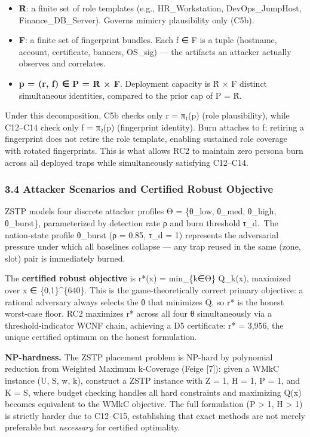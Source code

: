 \documentclass[
  11pt,
]{article}
\providecommand{\tightlist}{%
  \setlength{\itemsep}{0pt}\setlength{\parskip}{0pt}}
\begin{document}
\begin{itemize}
\tightlist
\item
  \textbf{R̂}: a finite set of role templates (e.g., HR\_Workstation,
  DevOps\_JumpHost, Finance\_DB\_Server). Governs mimicry plausibility
  only (C5b).
\item
  \textbf{F}: a finite set of fingerprint bundles. Each f ∈ F is a tuple
  (hostname, account, certificate, banners, OS\_sig) --- the artifacts
  an attacker actually observes and correlates.
\item
  \textbf{p = (r, f) ∈ P = R̂ × F}. Deployment capacity is
  \textbar R̂\textbar{} × \textbar F\textbar{} distinct simultaneous
  identities, compared to the prior cap of \textbar P\textbar{} =
  \textbar R̂\textbar.
\end{itemize}

Under this decomposition, C5b checks only r = π₁(p) (role plausibility),
while C12--C14 check only f = π₂(p) (fingerprint identity). Burn
attaches to f; retiring a fingerprint does not retire the role template,
enabling sustained role coverage with rotated fingerprints. This is what
allows RC2 to maintain zero persona burn across all deployed traps while
simultaneously satisfying C12--C14.

\hypertarget{attacker-scenarios-and-certified-robust-objective}{%
\subsubsection{3.4 Attacker Scenarios and Certified Robust
Objective}\label{attacker-scenarios-and-certified-robust-objective}}

ZSTP models four discrete attacker profiles Θ = \{θ\_low, θ\_med,
θ\_high, θ\_burst\}, parameterized by detection rate ρ and burn
threshold τ\_d.~The nation-state profile θ\_burst (ρ = 0.85, τ\_d = 1)
represents the adversarial pressure under which all baselines collapse
--- any trap reused in the same (zone, slot) pair is immediately burned.

The \textbf{certified robust objective} is r*(x) = min\_\{k∈Θ\} Q\_k(x),
maximized over x ∈ \{0,1\}\^{}\{640\}. This is the game-theoretically
correct primary objective: a rational adversary always selects the θ
that minimizes Q, so r* is the honest worst-case floor. RC2 maximizes r*
across all four θ simultaneously via a threshold-indicator WCNF chain,
achieving a D5 certificate: r* = 3,956, the unique certified optimum on
the honest formulation.

\textbf{NP-hardness.} The ZSTP placement problem is NP-hard by
polynomial reduction from Weighted Maximum k-Coverage (Feige {[}7{]}):
given a WMkC instance (U, S, w, k), construct a ZSTP instance with
\textbar Z\textbar{} = 1, H = 1, \textbar P\textbar{} = 1, and
\textbar K\textbar{} = \textbar S\textbar, where budget checking handles
all hard constraints and maximizing Q(x) becomes equivalent to the WMkC
objective. The full formulation (\textbar P\textbar{} \textgreater{} 1,
H \textgreater{} 1) is strictly harder due to C12--C15, establishing
that exact methods are not merely preferable but \emph{necessary} for
certified optimality.
\end{document}
